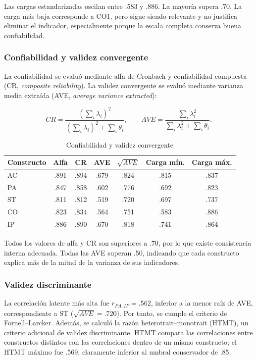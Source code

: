 \documentclass[12pt,letterpaper]{article}
\begin{document}
Las cargas estandarizadas oscilan entre .583 y .886. La mayoría supera .70. La carga más baja corresponde a CO1, pero sigue siendo relevante y no justifica eliminar el indicador, especialmente porque la escala completa conserva buena confiabilidad.

\subsubsection{Confiabilidad y validez convergente}

La confiabilidad se evaluó mediante alfa de Cronbach y confiabilidad compuesta (CR, \textit{composite reliability}). La validez convergente se evaluó mediante varianza media extraída (AVE, \textit{average variance extracted}):

\begin{equation}
CR=\frac{\left(\sum_i\lambda_i\right)^2}{\left(\sum_i\lambda_i\right)^2+\sum_i\theta_i},
\qquad
AVE=\frac{\sum_i\lambda_i^2}{\sum_i\lambda_i^2+\sum_i\theta_i}.
\end{equation}

\begin{table}[H]
\centering
\caption{Confiabilidad y validez convergente}
\begin{tabular}{lcccccc}
\toprule
Constructo & Alfa & CR & AVE & $\sqrt{AVE}$ & Carga mín. & Carga máx. \\
\midrule
AC & .891 & .894 & .679 & .824 & .815 & .837 \\
PA & .847 & .858 & .602 & .776 & .692 & .823 \\
ST & .811 & .812 & .519 & .720 & .697 & .737 \\
CO & .823 & .834 & .564 & .751 & .583 & .886 \\
IP & .886 & .890 & .670 & .818 & .741 & .864 \\
\bottomrule
\end{tabular}
\end{table}

Todos los valores de alfa y CR son superiores a .70, por lo que existe consistencia interna adecuada. Todas las AVE superan .50, indicando que cada constructo explica más de la mitad de la varianza de sus indicadores.

\subsubsection{Validez discriminante}

La correlación latente más alta fue $r_{PA,IP}=.562$, inferior a la menor raíz de AVE, correspondiente a ST ($\sqrt{AVE}=.720$). Por tanto, se cumple el criterio de Fornell--Larcker. Además, se calculó la razón heterotrait--monotrait (HTMT), un criterio adicional de validez discriminante. HTMT compara las correlaciones entre constructos distintos con las correlaciones dentro de un mismo constructo; el HTMT máximo fue .569, claramente inferior al umbral conservador de .85.
\end{document}
